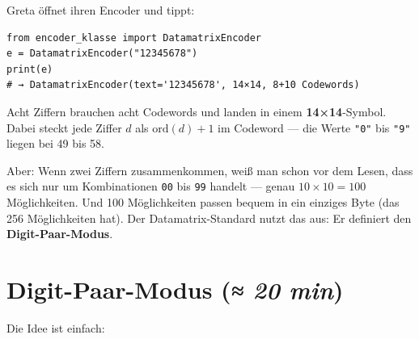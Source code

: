 Greta öffnet ihren Encoder und tippt:

\begin{verbatim}
from encoder_klasse import DatamatrixEncoder
e = DatamatrixEncoder("12345678")
print(e)
# → DatamatrixEncoder(text='12345678', 14×14, 8+10 Codewords)
\end{verbatim}

Acht Ziffern brauchen acht Codewords und landen in einem \textbf{14×14}-Symbol.
Dabei steckt jede Ziffer $d$ als $\text{ord}(d)+1$ im Codeword — die Werte
\texttt{"0"} bis \texttt{"9"} liegen bei 49 bis 58.

Aber: Wenn zwei Ziffern zusammenkommen, weiß man schon vor dem Lesen, dass
es sich nur um Kombinationen \texttt{00} bis \texttt{99} handelt — genau
$10 \times 10 = 100$ Möglichkeiten. Und 100 Möglichkeiten passen
bequem in ein einziges Byte (das 256 Möglichkeiten hat). Der
Datamatrix-Standard nutzt das aus: Er definiert den
\textbf{Digit-Paar-Modus}.

\section{Digit-Paar-Modus \normalfont(\textit{≈ 20 min})}

Die Idee ist einfach:

\begin{center}
\end{center}

